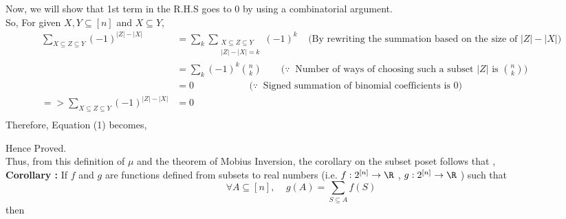 \noindent Now, we will show that 1st term in the R.H.S goes to 0 by using a combinatorial argument.\\

\noindent So, For given $X, Y \subseteq [n]$ and $X \subseteq Y$,
\begin{align*}
    \sum_{X \subseteq Z \subseteq Y} (-1)^{|Z|-|X|} &= \sum_{k} \sum_{\substack{X \subseteq Z \subseteq Y\\ |Z| - |X| = k}} (-1)^k ~~~~~\textrm{(By rewriting the summation based on the size of $|Z| - |X|$)}\\
    &= \sum_{k} (-1)^k {n \choose k} ~~~~~~~~~\textrm{($\because~$ Number of ways of choosing such a subset $|Z|$ is ${n \choose k}$) }\\
    &= 0 ~~~~~~~~~~~~~~~~~~~~~~~~~~\textrm{($\because ~$ Signed summation of binomial coefficients is $0$)}\\
=> \sum_{X \subseteq Z \subseteq Y} (-1)^{|Z|-|X|} &= 0\\
\end{align*}
Therefore, Equation (1) becomes,\\

\begin{center}
\end{center}

Hence Proved.\\

\noindent Thus, from this definition of $\mu$ and the theorem of Mobius Inversion, the corollary on the subset poset follows that ,\\

\noindent \textbf{Corollary :} If $f$ and $g$ are functions defined from subsets to real numbers (i.e. 
$f: 2^{[n]} \rightarrow \R$ , $g: 2^{[n]} \rightarrow \R $ ) such that
$$\forall A \subseteq [n], ~~~~~ g(A) = \sum_{S \subseteq A} f(S) $$
then
\begin{center}
\end{center}













